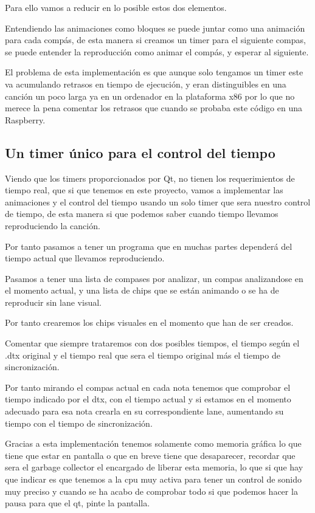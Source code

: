 \documentclass[a4paper,11pt,oneside]{book}
\begin{document}
Para ello vamos a reducir en lo posible estos dos elementos.

Entendiendo las animaciones como bloques se puede juntar como una animación para cada compás, de esta manera si creamos un timer para el siguiente compas, se puede entender la reproducción como animar el compás, y esperar al siguiente.

El problema de esta implementación es que aunque solo tengamos un timer este va acumulando retrasos en tiempo de ejecución, y eran distinguibles en una canción un poco larga ya en un ordenador en la plataforma x86 por lo que no merece la pena comentar los retrasos que cuando se probaba este código en una Raspberry.

\subsection{Un timer único para el control del tiempo}
Viendo que los timers proporcionados por Qt, no tienen los requerimientos de tiempo real, que si que tenemos en este proyecto, vamos a implementar las animaciones y el control del tiempo usando un solo timer que sera nuestro control de tiempo, de esta manera si que podemos saber cuando tiempo llevamos reproduciendo la canción.

Por tanto pasamos a tener un programa que en muchas partes dependerá del tiempo actual que llevamos reproduciendo.

Pasamos a tener una lista de compases por analizar, un compas analizandose en el momento actual, y una lista de chips que se están animando o se ha de reproducir sin lane visual.

Por tanto crearemos los chips visuales en el momento que han de ser creados.

Comentar que siempre trataremos con dos posibles tiempos, el tiempo según el .dtx original y el tiempo real que sera el tiempo original más el tiempo de sincronización. 

Por tanto mirando el compas actual en cada nota tenemos que comprobar el tiempo indicado por el dtx, con el tiempo actual y si estamos en el momento adecuado para esa nota crearla en su correspondiente lane, aumentando su tiempo con el tiempo de sincronización.

Gracias a esta implementación tenemos solamente como memoria gráfica lo que tiene que estar en pantalla o que en breve tiene que desaparecer, recordar que sera el garbage collector el encargado de liberar esta memoria, lo que si que hay que indicar es que tenemos a la cpu muy activa para tener un control de sonido muy preciso y cuando se ha acabo de comprobar todo si que podemos hacer la pausa para que el qt, pinte la pantalla.
\end{document}
